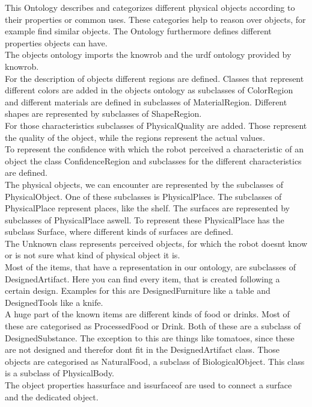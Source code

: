 \documentclass[main.tex]{subfiles}
\begin{document}
This Ontology describes and categorizes different physical objects according to their properties or common uses. These categories help to reason over objects, for example find similar objects. The Ontology furthermore defines different properties objects can have. \\
The objects ontology imports the knowrob and the urdf ontology provided by knowrob.\\
For the description of objects different regions are defined. Classes that represent different colors are added in the objects ontology as subclasses of ColorRegion and different materials are defined in subclasses of MaterialRegion. Different shapes are represented by subclasses of ShapeRegion.\\
For those characteristics subclasses of PhysicalQuality are added. Those represent the quality of the object, while the regions represent the actual values.\\
To represent the confidence with which the robot perceived a characteristic of an object the class ConfidenceRegion and subclasses for the different characteristics are defined.\\
The physical objects, we can encounter are represented by the subclasses of PhysicalObject.
One of these subclasses is PhysicalPlace. The subclasses of PhysicalPlace represent places, like the shelf. The surfaces are represented by subclasses of PhysicalPlace aswell. To represent these PhysicalPlace has the subclass Surface, where different kinds of surfaces are defined.\\
The Unknown class represents perceived objects, for which the robot doesnt know or is not sure what kind of physical object it is.\\
Most of the items, that have a representation in our ontology, are subclasses of DesignedArtifact.
Here you can find every item, that is created following a certain design. 
Examples for this are DesignedFurniture like a table and DesignedTools like a knife.\\
A huge part of the known items are different kinds of food or drinks. Most of these are categorised as ProcessedFood or Drink. Both of these are a subclass of DesignedSubstance. The exception to this are things like tomatoes, since these are not designed and therefor dont fit in the DesignedArtifact class. Those objects are categorised as NaturalFood, a subclass of BiologicalObject. This class is a subclass of PhysicalBody.\\
The object properties hassurface and issurfaceof are used to connect a surface and the dedicated object.\\
\end{document}
